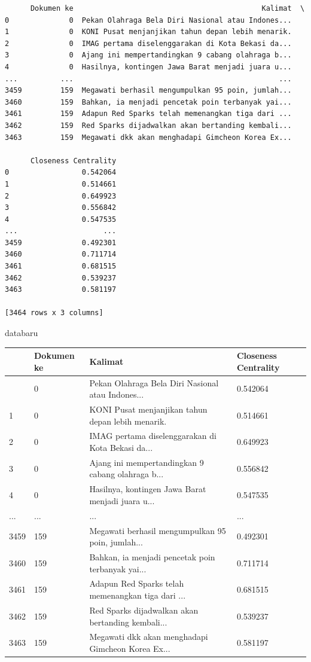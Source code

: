 \documentclass[
  letterpaper,
]{krantz}
\makeatletter
\newenvironment{Shaded}{\begin{snugshade}}{\end{snugshade}}
\newcommand{\NormalTok}[1]{\textcolor[rgb]{0.00,0.23,0.31}{#1}}
\newenvironment{kframe}{%
\medskip{}
\setlength{\fboxsep}{.8em}
 \def\at@end@of@kframe{}%
 \ifinner\ifhmode%
  \def\at@end@of@kframe{\end{minipage}}%
  \begin{minipage}{\columnwidth}%
 \fi\fi%
 \def\FrameCommand##1{\hskip\@totalleftmargin \hskip-\fboxsep
 \colorbox{shadecolor}{##1}\hskip-\fboxsep
     \hskip-\linewidth \hskip-\@totalleftmargin \hskip\columnwidth}%
 \MakeFramed {\advance\hsize-\width
   \@totalleftmargin\z@ \linewidth\hsize
   \@setminipage}}%
 {\par\unskip\endMakeFramed%
 \at@end@of@kframe}
\renewenvironment{Shaded}{\begin{kframe}}{\end{kframe}}
\makeatother
\begin{document}
\begin{verbatim}
      Dokumen ke                                            Kalimat  \
0              0  Pekan Olahraga Bela Diri Nasional atau Indones...   
1              0  KONI Pusat menjanjikan tahun depan lebih menarik.   
2              0  IMAG pertama diselenggarakan di Kota Bekasi da...   
3              0  Ajang ini mempertandingkan 9 cabang olahraga b...   
4              0  Hasilnya, kontingen Jawa Barat menjadi juara u...   
...          ...                                                ...   
3459         159  Megawati berhasil mengumpulkan 95 poin, jumlah...   
3460         159  Bahkan, ia menjadi pencetak poin terbanyak yai...   
3461         159  Adapun Red Sparks telah memenangkan tiga dari ...   
3462         159  Red Sparks dijadwalkan akan bertanding kembali...   
3463         159  Megawati dkk akan menghadapi Gimcheon Korea Ex...   

      Closeness Centrality  
0                 0.542064  
1                 0.514661  
2                 0.649923  
3                 0.556842  
4                 0.547535  
...                    ...  
3459              0.492301  
3460              0.711714  
3461              0.681515  
3462              0.539237  
3463              0.581197  

[3464 rows x 3 columns]
\end{verbatim}

\begin{Shaded}
\begin{Highlighting}[]
\NormalTok{databaru}
\end{Highlighting}
\end{Shaded}

\begin{longtable}[]{@{}llll@{}}
\toprule\noalign{}
& Dokumen ke & Kalimat & Closeness Centrality \\
\midrule\noalign{}
\endhead
\bottomrule\noalign{}
\endlastfoot
0 & 0 & Pekan Olahraga Bela Diri Nasional atau Indones... & 0.542064 \\
1 & 0 & KONI Pusat menjanjikan tahun depan lebih menarik. & 0.514661 \\
2 & 0 & IMAG pertama diselenggarakan di Kota Bekasi da... & 0.649923 \\
3 & 0 & Ajang ini mempertandingkan 9 cabang olahraga b... & 0.556842 \\
4 & 0 & Hasilnya, kontingen Jawa Barat menjadi juara u... & 0.547535 \\
... & ... & ... & ... \\
3459 & 159 & Megawati berhasil mengumpulkan 95 poin, jumlah... &
0.492301 \\
3460 & 159 & Bahkan, ia menjadi pencetak poin terbanyak yai... &
0.711714 \\
3461 & 159 & Adapun Red Sparks telah memenangkan tiga dari ... &
0.681515 \\
3462 & 159 & Red Sparks dijadwalkan akan bertanding kembali... &
0.539237 \\
3463 & 159 & Megawati dkk akan menghadapi Gimcheon Korea Ex... &
0.581197 \\
\end{longtable}
\end{document}

